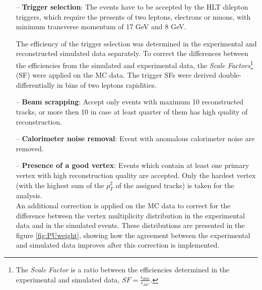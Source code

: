 \begin{itemize}
 \item [--] \textbf{Trigger selection}: The events have to be accepted by the HLT dilepton triggers, which require the presents of two leptons, electrons or muons, with
 minimum transverse momentum of 17 GeV and 8 GeV.
 
 The efficiency of the trigger selection was determined in the experimental and reconstructed simulated data separately. To correct the differences between the efficiencies
 from the simulated and experimental data, the \textit{Scale Factors}\footnote{The \textit{Scale Factor} is a ratio between the efficiencies determined in the experimental 
 and simulated data, $SF = \frac{\epsilon_{data}}{\epsilon_{MC}}$.} 
 (SF) were applied on the MC data. The trigger SFs were derived double-differentially in bins of two leptons rapidities. 
 \item [--] \textbf{Beam scrapping}: Accept only events with maximum 10 reconstructed tracks, or more then 10 in case at least quarter of them has high quality of reconstruction.
 \item [--] \textbf{Calorimeter noise removal}: Event with anomalous calorimeter noise are removed.
 \item [--] \textbf{Presence of a good vertex}: Events which contain at least one primary vertex with high reconstruction quality are accepted.
 Only the hardest vertex (with the highest sum of the $p_{T}^{2}$ of the assigned tracks) is taken for the analysis. 
 \\
 An additional correction is applied on the MC data to correct for the difference between the vertex multiplicity distribution in 
 the experimental data and in the simulated events. These distributions are presented in the figure \ref{fig:PUweight}, showing how the agreement
 between the experimental and simulated data improves after this correction is implemented.
 

\end{itemize}
